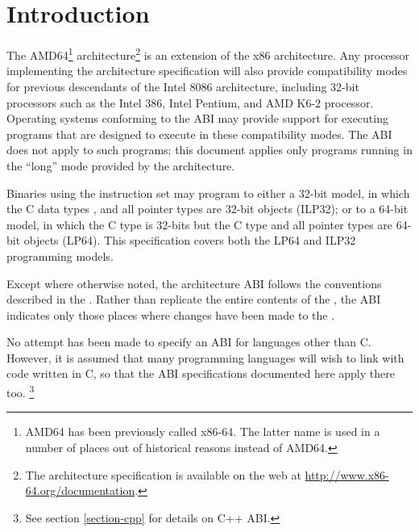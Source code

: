\chapter{Introduction\label{intro}}

The AMD64\footnote{AMD64 has been previously called x86-64.  The
  latter name is used in a number of places out of historical reasons
  instead of AMD64.}  architecture\footnote{The architecture
  specification is available on the web at
  \url{http://www.x86-64.org/documentation}.} is an extension of the
x86 architecture.  Any processor implementing the \xARCH architecture
specification will also provide compatibility modes for previous
descendants of the Intel 8086 architecture, including 32-bit
processors such as the Intel 386, Intel Pentium, and AMD K6-2
processor.  Operating systems conforming to the \xARCH ABI may provide
support for executing programs that are designed to execute in these
compatibility modes.  The \xARCH ABI does not apply to such programs;
this document applies only programs running in the ``long'' mode
provided by the \xARCH architecture.

Binaries using the \xARCH instruction set may program to either a 32-bit
model, in which the C data types ,  and all
pointer types are 32-bit objects (ILP32); or to a 64-bit model,
in which the C  type is 32-bits but the C  type
and all pointer types are 64-bit objects (LP64). This specification
covers both the LP64 and ILP32 programming models.

Except where otherwise noted, the \xARCH architecture ABI follows the
conventions described in the \intelabi.  Rather than replicate the
entire contents of the \intelabi, the \xARCH ABI indicates only those
places where changes have been made to the \intelabi.

No attempt has been made to specify an ABI for languages other than C.
However, it is assumed that many programming languages will wish to
link with code written in C, so
that the ABI specifications documented here apply there too.%
\footnote{See section \ref{section-cpp} for details on C++ ABI.}

